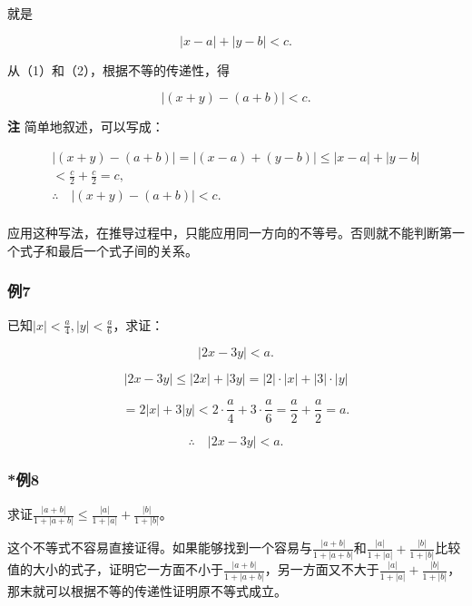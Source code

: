 就是

\[
\left| x - a \right| + \left| y - b \right| < c. \tag {2}
\]

从（1）和（2），根据不等的传递性，得

\[
\mid (x + y) - (a + b) \mid < c.
\]

\textbf{注} 简单地叙述，可以写成：

\[
\begin{array}{l} \left| (x + y) - (a + b) \right| = \left| (x - a) + (y - b) \right| \leqslant | x - a | + | y - b | \\ < \frac{c}{2} + \frac{c}{2} = c, \\ \therefore \quad | (x + y) - (a + b) | < c. \\ \end{array}
\]

应用这种写法，在推导过程中，只能应用同一方向的不等号。否则就不能判断第一个式子和最后一个式子间的关系。

\subsubsection{例7}

已知\(|x| < \frac{a}{4}, |y| < \frac{a}{6}\)，求证：

\[
\left| 2 x - 3 y \right| < a.
\]


\[
\left| 2 x - 3 y \right| \leqslant \left| 2 x \right| + \left| 3 y \right| = \left| 2 \right| \cdot \left| x \right| + \left| 3 \right| \cdot \left| y \right|
\]

\[
= 2 | x | + 3 | y | < 2 \cdot \frac{a}{4} + 3 \cdot \frac{a}{6} = \frac{a}{2} + \frac{a}{2} = a.
\]

\[
\therefore \quad |2x-3y| < a.
\]

\subsubsection{*例8}

求证\(\frac{|a + b|}{1 + |a + b|} \leqslant \frac{|a|}{1 + |a|} + \frac{|b|}{1 + |b|}\)。

这个不等式不容易直接证得。如果能够找到一个容易与\(\frac{|a + b|}{1 + |a + b|}\)和\(\frac{|a|}{1 + |a|} + \frac{|b|}{1 + |b|}\)比较值的大小的式子，证明它一方面不小于\(\frac{|a + b|}{1 + |a + b|}\)，另一方面又不大于\(\frac{|a|}{1 + |a|} + \frac{|b|}{1 + |b|}\)，那末就可以根据不等的传递性证明原不等式成立。

